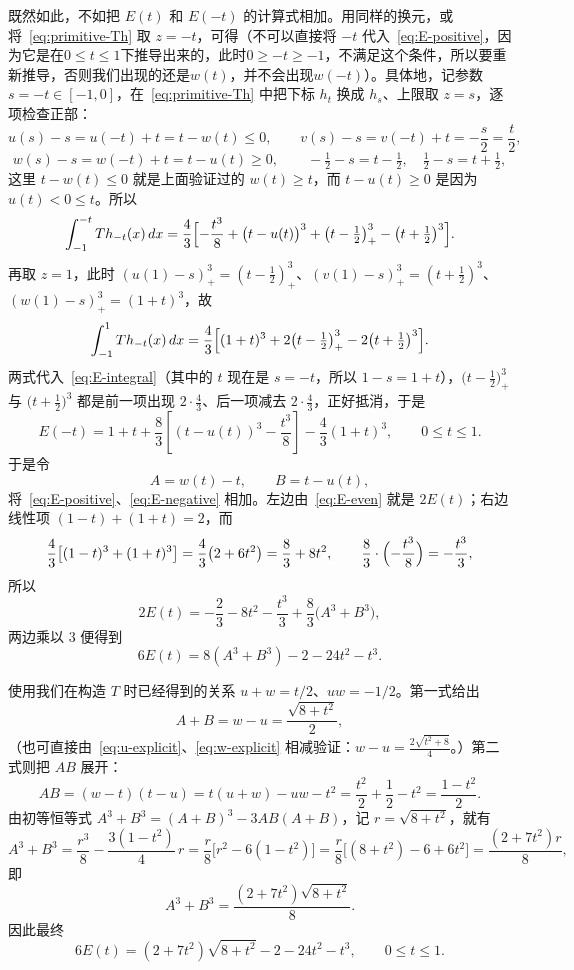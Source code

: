 \documentclass[UTF8,fontset=windows,a4paper,11pt]{ctexart}
\begin{document}
既然如此，不如把 $E(t)$ 和 $E(-t)$ 的计算式相加。用同样的换元，或将~\eqref{eq:primitive-Th} 取 $z=-t$，可得（不可以直接将 $-t$ 代入~\eqref{eq:E-positive}，因为它是在$0\le t\le 1$下推导出来的，此时$0\ge -t \ge -1$，不满足这个条件，所以要重新推导，否则我们出现的还是$w(t)$，并不会出现$w(-t)$）。具体地，记参数 $s=-t\in[-1,0]$，在~\eqref{eq:primitive-Th} 中把下标 $h_t$ 换成 $h_s$、上限取 $z=s$，逐项检查正部：
\[
    u(s)-s=u(-t)+t=t-w(t)\le0,\qquad
    v(s)-s=v(-t)+t=-\frac{s}{2}=\frac{t}{2},
\]
\[
    w(s)-s=w(-t)+t=t-u(t)\ge0,\qquad
    -\tfrac12-s=t-\tfrac12,\quad \tfrac12-s=t+\tfrac12,
\]
这里 $t-w(t)\le0$ 就是上面验证过的 $w(t)\ge t$，而 $t-u(t)\ge0$ 是因为 $u(t)<0\le t$。所以
\[
    \int_{-1}^{-t}Th_{-t}(x)\,dx
    =\frac43\Bigl[-\frac{t^3}{8}+\bigl(t-u(t)\bigr)^3+\bigl(t-\tfrac12\bigr)_+^3-\bigl(t+\tfrac12\bigr)^3\Bigr].
\]
再取 $z=1$，此时 $(u(1)-s)_+^3=(t-\frac12)_+^3$、$(v(1)-s)_+^3=(t+\frac12)^3$、$(w(1)-s)_+^3=(1+t)^3$，故
\[
    \int_{-1}^{1}Th_{-t}(x)\,dx
    =\frac43\Bigl[(1+t)^3+2\bigl(t-\tfrac12\bigr)_+^3-2\bigl(t+\tfrac12\bigr)^3\Bigr].
\]
两式代入~\eqref{eq:E-integral}（其中的 $t$ 现在是 $s=-t$，所以 $1-s=1+t$），$\bigl(t-\frac12\bigr)_+^3$ 与 $\bigl(t+\frac12\bigr)^3$ 都是前一项出现 $2\cdot\frac43$、后一项减去 $2\cdot\frac43$，正好抵消，于是
\begin{equation}
    E(-t)=1+t+\frac83\left[(t-u(t))^3-\frac{t^3}{8}\right]
                    -\frac43(1+t)^3,
    \qquad 0\le t\le1.
    \label{eq:E-negative}
\end{equation}
于是令
\[
    A=w(t)-t,\qquad B=t-u(t),
\]
将~\eqref{eq:E-positive}、\eqref{eq:E-negative} 相加。左边由~\eqref{eq:E-even} 就是 $2E(t)$；右边线性项 $(1-t)+(1+t)=2$，而
\[
    \frac43\bigl[(1-t)^3+(1+t)^3\bigr]=\frac43\bigl(2+6t^2\bigr)=\frac83+8t^2,
    \qquad
    \frac83\cdot\Bigl(-\frac{t^3}{8}\Bigr)=-\frac{t^3}{3},
\]
所以
\[
    2E(t)=-\frac23-8t^2-\frac{t^3}{3}+\frac83\bigl(A^3+B^3\bigr),
\]
两边乘以 $3$ 便得到
\begin{equation}
    6E(t)=8(A^3+B^3)-2-24t^2-t^3.
    \label{eq:E-AB}
\end{equation}

使用我们在构造 $T$ 时已经得到的关系 $u+w=t/2$、$uw=-1/2$。第一式给出
\[
    A+B=w-u=\frac{\sqrt{8+t^2}}{2},
\]
（也可直接由~\eqref{eq:u-explicit}、\eqref{eq:w-explicit} 相减验证：$w-u=\frac{2\sqrt{t^2+8}}{4}$。）第二式则把 $AB$ 展开：
\[
    AB=(w-t)(t-u)=t(u+w)-uw-t^2=\frac{t^2}{2}+\frac12-t^2=\frac{1-t^2}{2}.
\]
由初等恒等式 $A^3+B^3=(A+B)^3-3AB(A+B)$，记 $r=\sqrt{8+t^2}$，就有
\[
    A^3+B^3=\frac{r^3}{8}-\frac{3(1-t^2)}{4}\,r
    =\frac{r}{8}\bigl[r^2-6(1-t^2)\bigr]
    =\frac{r}{8}\bigl[(8+t^2)-6+6t^2\bigr]
    =\frac{(2+7t^2)r}{8},
\]
即
\begin{equation}
    A^3+B^3=\frac{(2+7t^2)\sqrt{8+t^2}}{8}.
    \label{eq:AB-cubes}
\end{equation}
因此最终
\begin{equation}
    \boxed{6E(t)=(2+7t^2)\sqrt{8+t^2}-2-24t^2-t^3},
    \qquad 0\le t\le1.
    \label{eq:E-explicit}
\end{equation}
\end{document}
